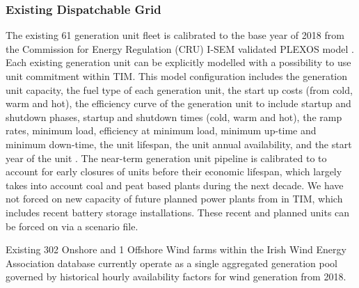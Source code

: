 \documentclass[gmd,manuscript]{copernicus}
\begin{document}
\subsubsection{Existing Dispatchable Grid}
The existing 61 generation unit fleet is calibrated to the base year of 2018 from the Commission for Energy Regulation (CRU) I-SEM validated PLEXOS model \citep{Geffert2018}. Each existing generation unit can be explicitly modelled with a possibility to use unit commitment within TIM. This model configuration includes the generation unit capacity, the fuel type of each generation unit, the start up costs (from cold, warm and hot), the efficiency curve of the generation unit to include startup and shutdown phases, startup and shutdown times (cold, warm and hot), the ramp rates, minimum load, efficiency at minimum load, minimum up-time and minimum down-time, the unit lifespan, the unit annual availability, and the start year of the unit \citep{Geffert2018}. The near-term generation unit pipeline is calibrated to \citet{EirGridadSONI2019,EirGrid&SONI2020} to account for early closures of units before their economic lifespan, which largely takes into account coal and peat based plants during the next decade. We have not forced on new capacity of future planned power plants from \citet{EirGrid&SONI2020} in TIM, which includes recent battery storage installations. These recent and planned units can be forced on via a scenario file. 

Existing 302 Onshore and 1 Offshore Wind farms within the Irish Wind Energy Association database currently operate as a single aggregated generation pool governed by historical hourly availability factors for wind generation from 2018.
\end{document}
